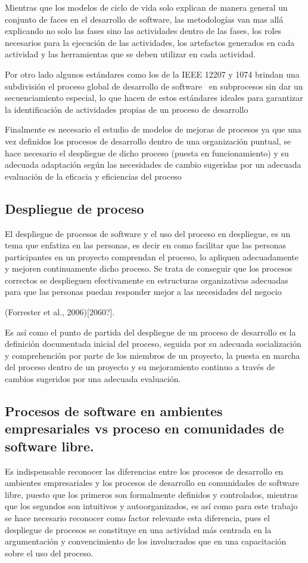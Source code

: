Mientras que los modelos de ciclo de vida solo explican de manera general un conjunto de faces en el desarrollo de software, las metodologías van mas allá explicando no solo las fases sino las actividades dentro de las fases, los roles necesarios para la ejecución de las actividades, los artefactos generados en cada actividad y las herramientas que se deben utilizar en cada actividad.

Por otro lado algunos estándares como los de la IEEE 12207 y 1074 brindan una subdivisión el proceso global de desarrollo de software \ en subprocesos sin dar un secuenciamiento especial, lo que hacen de estos estándares ideales para garantizar la identificación de actividades propias de un proceso de desarrollo

Finalmente es necesario el estudio de modelos de mejoras de procesos ya que una vez definidos los procesos de desarrollo dentro de una organización puntual, se hace necesario el despliegue de dicho proceso (puesta en funcionamiento) y su adecuada adaptación según las necesidades de cambio sugeridas por un adecuada evaluación de la eficacia y eficiencias del proceso

\subsection{Despliegue de proceso}
El despliegue de procesos de software y el uso del proceso en despliegue, es un tema que enfatiza en las personas, es decir en como facilitar que las personas participantes en un proyecto comprendan el proceso, lo apliquen adecuadamente y mejoren continuamente dicho proceso. Se trata de conseguir que los procesos correctos se desplieguen efectivamente en estructuras organizativas adecuadas para que las personas puedan responder mejor a las necesidades del negocio

(Forrester et al., 2006)[2060?]. 

Es así como el punto de partida del despliegue de un proceso de desarrollo es la definición documentada inicial del proceso, seguida por su adecuada socialización y comprehención por parte de los miembros de un proyecto, la puesta en marcha del proceso dentro de un proyecto y su mejoramiento continuo a través de cambios sugeridos por una adecuada evaluación.

\subsection{Procesos de software en ambientes empresariales vs proceso en comunidades de software libre.}
Es indispensable reconocer las diferencias entre los procesos de desarrollo en ambientes empresariales y los procesos de desarrollo en comunidades de software libre, puesto que los primeros son formalmente definidos y controlados, mientras que los segundos son intuitivos y autoorganizados, es así como para este trabajo se hace necesario reconocer como factor relevante esta diferencia, pues el despliegue de procesos se constituye en una actividad más centrada en la argumentación y convencimiento de los involucrados que en una capacitación sobre el uso del proceso.

